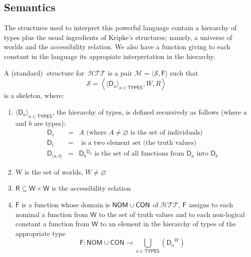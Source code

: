 \subsection{Semantics}

The structures used to interpret this powerful language contain a hierarchy
of types plus the usual ingredients of Kripke's structures; namely, a
universe of worlds and the accessibility relation. We also have a function
giving to each constant in the language its appropiate interpretation in the
hierarchy.

A (standard)\textbf{\ }structure for\emph{\ }$\mathcal{HTT}$ is a pair $%
\mathcal{M}=\langle \mathcal{S},\mathsf{F}\rangle $ such that%
\begin{equation*}
\mathcal{S}=\left\langle \langle \mathsf{D}_{a}\rangle _{a\in \mathsf{TYPES}%
},W,R\right\rangle
\end{equation*}
is a skeleton, where:

\begin{enumerate}
\item $\langle \mathsf{D}_{a}\rangle _{a\in \mathsf{TYPES}}$, the hierarchy
of types, is defined recursively as follows (where $a$ and $b$ are types):%
\begin{equation*}
\begin{array}{rcl}
\mathsf{D}_{e} & = & A\text{ (where }A\not=\varnothing \text{ is the set of
individuals)} \\ 
\mathsf{D}_{t} & = & \text{ is a two element set (the truth values)} \\ 
\mathsf{D}_{\langle a,b\rangle } & = & \mathsf{D}_{b}{}^{\mathsf{D}_{a}}%
\text{ is the set of all functions from }\mathsf{D}_{a}\text{ into }\mathsf{D%
}_{b}%
\end{array}%
\end{equation*}

\item W is the set of worlds, $W\not=\varnothing $

\item $\mathsf{R}\subseteq \mathsf{W}\times \mathsf{W}$ is the accessibility
relation

\item $\mathsf{F}$ is a function whose domain is $\mathsf{NOM}\cup \mathsf{%
CON}$ of $\mathcal{HTT}$, $\mathsf{F}$ assigns to each nominal a function
from $\mathsf{W}$ to the set of truth values and to each non-logical
constant a function from $\mathsf{W}$ to an element in the hierarchy of
types of the appropriate type 
\begin{equation*}
\mathsf{F}:\mathsf{NOM}\cup \mathsf{CON}\longrightarrow \bigcup\limits_{a\in 
\mathsf{TYPES}}\left( \left. \mathsf{D}_{a}\right. ^{W}\right)
\end{equation*}
\end{enumerate}
